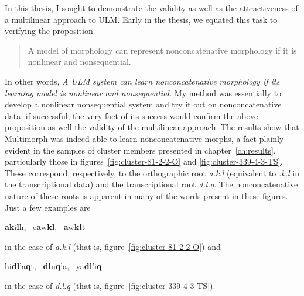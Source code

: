 In this thesis, I sought to demonstrate the validity as well as the attractiveness of a multilinear approach to ULM. 
Early in the thesis,
we equated this task to verifying the proposition
\begin{quote}\noindent
A model of morphology can represent nonconcatenative morphology if it is nonlinear and nonsequential.
\end{quote}
In other words, \textit{A ULM system can learn nonconcatenative morphology if its learning model is nonlinear and nonsequential.}
My method was essentially to develop a nonlinear nonsequential system and try it out on nonconcatenative data; if successful, the very fact of its success would confirm the above proposition as well the validity of the multilinear approach.
The results show that Multimorph was indeed able to learn nonconcatenative morphs, %
a fact plainly evident in the samples of cluster members presented in chapter~\ref{ch:results},
particularly those in figures~\ref{fig:cluster-81-2-2-O} and \ref{fig:cluster-339-4-3-TS}. These correspond, respectively, to the orthographic root \textit{a.k.l} (equivalent to \textit{.k.l} in the transcriptional data) and 
the transcriptional root \textit{d.l.q}. %
The nonconcatenative nature of these roots is apparent in many of the words present in these figures. Just a few examples are
\begin{center}
\textbf{a}\textbf{k}i\textbf{l}h, \, e\textbf{a}w\textbf{k}\textbf{l}, \, \textbf{a}w\textbf{k}\textbf{l}t 
\end{center}
in the case of \textit{a.k.l} (that is, figure~\ref{fig:cluster-81-2-2-O}) and
\begin{center}
\vspace{-28pt}
\ex hi\textbf{d}\textbf{l}\a'{a}\textbf{q}t, \, \textbf{d}\textbf{l}u\textbf{q}\a'{a}, \, ya\textbf{d}\textbf{l}\a'{i}\textbf{q}
\end{center}
in the case of \textit{d.l.q} (that is, figure~\ref{fig:cluster-339-4-3-TS}).

%

